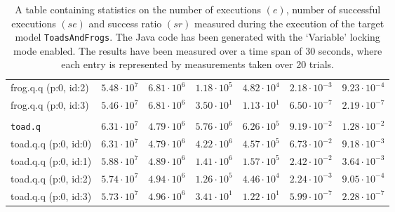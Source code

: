 \begin{table}[htbp]
{\begin{tabular}{lrrrrrr}
\hspace{3mm}frog.q.q (p:0, id:2)              & $5.48 \cdot 10^{7}$ & $6.81 \cdot 10^{6}$ & $1.18 \cdot 10^{5}$ & $4.82 \cdot 10^{4}$ & $2.18 \cdot 10^{-3}$ & $9.23 \cdot 10^{-4}$ \\
\hspace{3mm}frog.q.q (p:0, id:3)              & $5.46 \cdot 10^{7}$ & $6.81 \cdot 10^{6}$ & $3.50 \cdot 10^{1}$ & $1.13 \cdot 10^{1}$ & $6.50 \cdot 10^{-7}$ & $2.19 \cdot 10^{-7}$ \\
\\[-8pt]\texttt{toad.q}                       & $6.31 \cdot 10^{7}$ & $4.79 \cdot 10^{6}$ & $5.76 \cdot 10^{6}$ & $6.26 \cdot 10^{5}$ & $9.19 \cdot 10^{-2}$ & $1.28 \cdot 10^{-2}$ \\
\hspace{3mm}toad.q.q (p:0, id:0)              & $6.31 \cdot 10^{7}$ & $4.79 \cdot 10^{6}$ & $4.22 \cdot 10^{6}$ & $4.57 \cdot 10^{5}$ & $6.73 \cdot 10^{-2}$ & $9.18 \cdot 10^{-3}$ \\
\hspace{3mm}toad.q.q (p:0, id:1)              & $5.88 \cdot 10^{7}$ & $4.89 \cdot 10^{6}$ & $1.41 \cdot 10^{6}$ & $1.57 \cdot 10^{5}$ & $2.42 \cdot 10^{-2}$ & $3.64 \cdot 10^{-3}$ \\
\hspace{3mm}toad.q.q (p:0, id:2)              & $5.74 \cdot 10^{7}$ & $4.94 \cdot 10^{6}$ & $1.26 \cdot 10^{5}$ & $4.46 \cdot 10^{4}$ & $2.24 \cdot 10^{-3}$ & $9.05 \cdot 10^{-4}$ \\
\hspace{3mm}toad.q.q (p:0, id:3)              & $5.73 \cdot 10^{7}$ & $4.96 \cdot 10^{6}$ & $3.41 \cdot 10^{1}$ & $1.22 \cdot 10^{1}$ & $5.99 \cdot 10^{-7}$ & $2.28 \cdot 10^{-7}$ \\
\bottomrule
\end{tabular}
}
\caption{A table containing statistics on the number of executions $(e)$, number of successful executions $(se)$ and success ratio $(sr)$ measured during the execution of the target model \texttt{ToadsAndFrogs}. The Java code has been generated with the `Variable' locking mode enabled. The results have been measured over a time span of 30 seconds, where each entry is represented by measurements taken over 20 trials.}
\label{table:frequency_results_toadsandfrogs_variable}
\end{table}